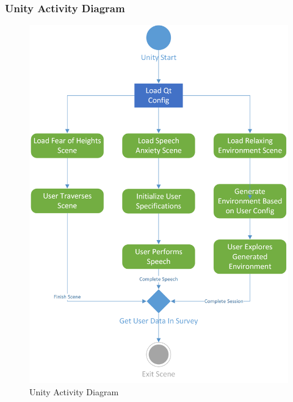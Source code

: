\documentclass[a4paper,10pt]{article}
\begin{document}
		\subsubsection{Unity Activity Diagram}
				\begin{figure}[H]
					\centerline{\includegraphics[]{unityActivityDiag.png}}
					\caption{Unity Activity Diagram}
					\label{fig:unityactivity}
				\end{figure}
				\pagebreak
\end{document}
